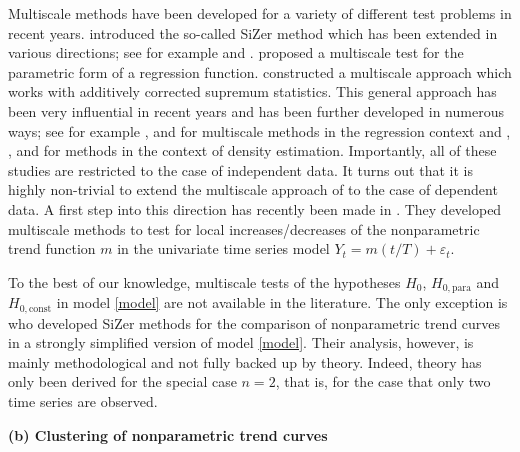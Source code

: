 \documentclass[a4paper,12pt]{article}
\begin{document}
Multiscale methods have been developed for a variety of different test problems in recent years. \cite{ChaudhuriMarron1999, ChaudhuriMarron2000} introduced the so-called SiZer method which has been extended in various directions; see for example \cite{HannigMarron2006} and \cite{Rondonotti2007}. \cite{HorowitzSpokoiny2001} proposed a multiscale test for the parametric form of a regression function. \cite{DuembgenSpokoiny2001} constructed a multiscale approach which works with additively corrected supremum statistics. This general approach has been very influential in recent years and has been further developed in numerous ways; see for example \cite{Duembgen2002}, \cite{Rohde2008} and \cite{ProkschWernerMunk2018} for multiscale methods in the regression context and \cite{DuembgenWalther2008}, \cite{RufibachWalther2010}, \cite{SchmidtHieber2013} and \cite{EckleBissantzDette2017} for methods in the context of density estimation. Importantly, all of these studies are restricted to the case of independent data. It turns out that it is highly non-trivial to extend the multiscale approach of \cite{DuembgenSpokoiny2001} to the case of dependent data. A first step into this direction has recently been made in \cite{KhismatullinaVogt2018}. They developed multiscale methods to test for local increases/decreases of the nonparametric trend function $m$ in the univariate time series model $Y_t = m(t/T) + \varepsilon_t$.  


To the best of our knowledge, multiscale tests of the hypotheses $H_0$, $H_{0,\text{para}}$ and $H_{0,\text{const}}$ in model \eqref{model} are not available in the literature. The only exception is \cite{Park2009} who developed SiZer methods for the comparison of nonparametric trend curves in a strongly simplified version of model \eqref{model}. Their analysis, however, is mainly methodological and not fully backed up by theory. Indeed, theory has only been derived for the special case $n=2$, that is, for the case that only two time series are observed. 
\vspace{10pt}


\noindent \textbf{(b) Clustering of nonparametric trend curves} 
\vspace{10pt} 
\end{document}
